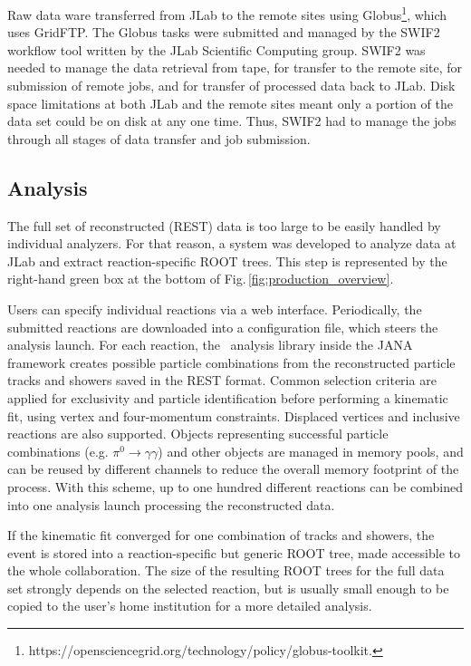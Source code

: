 Raw data ware transferred from JLab to the remote sites using Globus\footnote{https://opensciencegrid.org/technology/policy/globus-toolkit.},  which uses GridFTP. The Globus tasks were submitted and managed by the SWIF2 workflow tool written by the JLab Scientific Computing group. SWIF2 was needed to manage the data retrieval from tape, for transfer to the remote site, for submission of remote jobs, and for transfer of processed data back to JLab. Disk space limitations at both JLab and the remote sites meant only a portion of the data set could be on disk at any one time. Thus, SWIF2 had to manage the jobs through all stages of data transfer and job submission.

\subsection{Analysis \label{sec:recanalysis}}

The full set of reconstructed (REST) data is too large to be easily handled by individual analyzers. For that reason, a system was developed to analyze data at JLab and extract reaction-specific ROOT trees. This step is represented by the right-hand green box at the bottom of Fig.\,\ref{fig:production_overview}.

Users can specify individual reactions via a web interface.
Periodically, the submitted reactions are downloaded into a configuration file, which steers the analysis launch. For each reaction, the \GX~analysis library inside the JANA framework creates possible particle combinations from the reconstructed particle tracks and showers saved in the REST format. Common selection criteria are applied for exclusivity and particle identification before performing a kinematic fit, using vertex and four-momentum constraints. Displaced vertices and inclusive reactions are also supported. Objects representing successful particle combinations (e.g. $\pi^0 \rightarrow \gamma\gamma$) and other objects are managed in memory pools, and can be reused by different channels to reduce the overall memory footprint of the process. With this scheme, up to one hundred different reactions can be combined into one analysis launch processing the reconstructed data.

If the kinematic fit converged for one combination of tracks and showers, the event is stored into a reaction-specific but generic ROOT tree, made accessible to the whole collaboration. The size of the resulting ROOT trees for the full data set strongly depends on the selected reaction, but is usually small enough to be copied to the user's home institution for a more detailed analysis.

